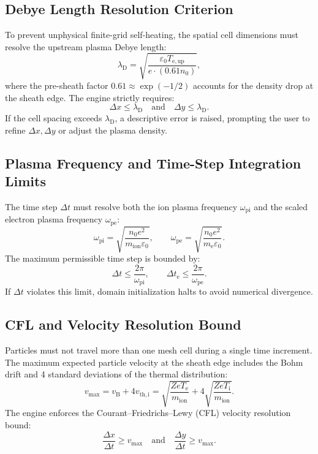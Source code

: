 \documentclass[11pt,a4paper]{article}
\begin{document}
\subsection{Debye Length Resolution Criterion}
To prevent unphysical finite-grid self-heating, the spatial cell dimensions must resolve the upstream plasma Debye length:
\begin{equation}
    \lambda_{\mathrm{D}} = \sqrt{\frac{\varepsilon_0 T_{\mathrm{e,up}}}{e \cdot (0.61 n_0)}},
\end{equation}
where the pre-sheath factor $0.61 \approx \exp(-1/2)$ accounts for the density drop at the sheath edge. The engine strictly requires:
\begin{equation}
    \Delta x \le \lambda_{\mathrm{D}} \quad \text{and} \quad \Delta y \le \lambda_{\mathrm{D}}.
\end{equation}
If the cell spacing exceeds $\lambda_{\mathrm{D}}$, a descriptive error is raised, prompting the user to refine $\Delta x, \Delta y$ or adjust the plasma density.

\subsection{Plasma Frequency and Time-Step Integration Limits}
The time step $\Delta t$ must resolve both the ion plasma frequency $\omega_{\mathrm{pi}}$ and the scaled electron plasma frequency $\omega_{\mathrm{pe}}$:
\begin{equation}
    \omega_{\mathrm{pi}} = \sqrt{\frac{n_0 e^2}{m_{\mathrm{ion}} \varepsilon_0}}, \qquad
    \omega_{\mathrm{pe}} = \sqrt{\frac{n_0 e^2}{m_{\mathrm{e}} \varepsilon_0}}.
\end{equation}
The maximum permissible time step is bounded by:
\begin{equation}
    \Delta t \le \frac{2\pi}{\omega_{\mathrm{pi}}}, \qquad \Delta t_{\mathrm{e}} \le \frac{2\pi}{\omega_{\mathrm{pe}}}.
\end{equation}
If $\Delta t$ violates this limit, domain initialization halts to avoid numerical divergence.

\subsection{CFL and Velocity Resolution Bound}
Particles must not travel more than one mesh cell during a single time increment. The maximum expected particle velocity at the sheath edge includes the Bohm drift and 4 standard deviations of the thermal distribution:
\begin{equation}
    v_{\max} = v_{\mathrm{B}} + 4 v_{\mathrm{th,i}} = \sqrt{\frac{Z e T_{\mathrm{e}}}{m_{\mathrm{ion}}}} + 4\sqrt{\frac{Z e T_{\mathrm{i}}}{m_{\mathrm{ion}}}}.
\end{equation}
The engine enforces the Courant--Friedrichs--Lewy (CFL) velocity resolution bound:
\begin{equation}
    \frac{\Delta x}{\Delta t} \ge v_{\max} \quad \text{and} \quad \frac{\Delta y}{\Delta t} \ge v_{\max}.
\end{equation}
\end{document}
